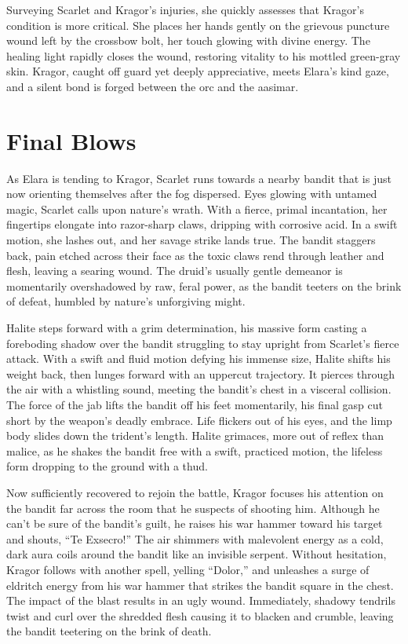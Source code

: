\documentclass[
  12pt,twoside,twocolumn,openany,nodeprecatedcode]{dndbook}
\begin{document}
Surveying Scarlet and Kragor's injuries, she quickly assesses that
Kragor's condition is more critical. She places her hands gently on the
grievous puncture wound left by the crossbow bolt, her touch glowing
with divine energy. The healing light rapidly closes the wound,
restoring vitality to his mottled green-gray skin. Kragor, caught off
guard yet deeply appreciative, meets Elara's kind gaze, and a silent
bond is forged between the orc and the aasimar.

\section{Final Blows}\label{final-blows}

As Elara is tending to Kragor, Scarlet runs towards a nearby bandit that
is just now orienting themselves after the fog dispersed. Eyes glowing
with untamed magic, Scarlet calls upon nature's wrath. With a fierce,
primal incantation, her fingertips elongate into razor-sharp claws,
dripping with corrosive acid. In a swift motion, she lashes out, and her
savage strike lands true. The bandit staggers back, pain etched across
their face as the toxic claws rend through leather and flesh, leaving a
searing wound. The druid's usually gentle demeanor is momentarily
overshadowed by raw, feral power, as the bandit teeters on the brink of
defeat, humbled by nature's unforgiving might.

Halite steps forward with a grim determination, his massive form casting
a foreboding shadow over the bandit struggling to stay upright from
Scarlet's fierce attack. With a swift and fluid motion defying his
immense size, Halite shifts his weight back, then lunges forward with an
uppercut trajectory. It pierces through the air with a whistling sound,
meeting the bandit's chest in a visceral collision. The force of the jab
lifts the bandit off his feet momentarily, his final gasp cut short by
the weapon's deadly embrace. Life flickers out of his eyes, and the limp
body slides down the trident's length. Halite grimaces, more out of
reflex than malice, as he shakes the bandit free with a swift, practiced
motion, the lifeless form dropping to the ground with a thud.

Now sufficiently recovered to rejoin the battle, Kragor focuses his
attention on the bandit far across the room that he suspects of shooting
him. Although he can't be sure of the bandit's guilt, he raises his war
hammer toward his target and shouts, ``Te Exsecro!'' The air shimmers
with malevolent energy as a cold, dark aura coils around the bandit like
an invisible serpent. Without hesitation, Kragor follows with another
spell, yelling ``Dolor,'' and unleashes a surge of eldritch energy from
his war hammer that strikes the bandit square in the chest. The impact
of the blast results in an ugly wound. Immediately, shadowy tendrils
twist and curl over the shredded flesh causing it to blacken and
crumble, leaving the bandit teetering on the brink of death.
\end{document}
